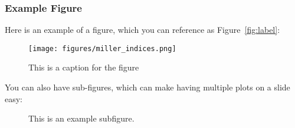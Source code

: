 \begin{frame}
    \frametitle{Example Figure}
    Here is an example of a figure, which you can reference as Figure~\ref{fig:label}:
    \begin{figure}
        \centering
        \texttt{[image: figures/miller\_indices.png]}
        \caption{This is a caption for the figure}
        \label{fig:my_label}
    \end{figure}
    You can also have sub-figures, which can make having multiple plots on a slide easy:
    \begin{figure}
        \centering
        \quad
        \caption{This is an example subfigure.}
        \label{fig:my_label2}
    \end{figure}
\end{frame}
